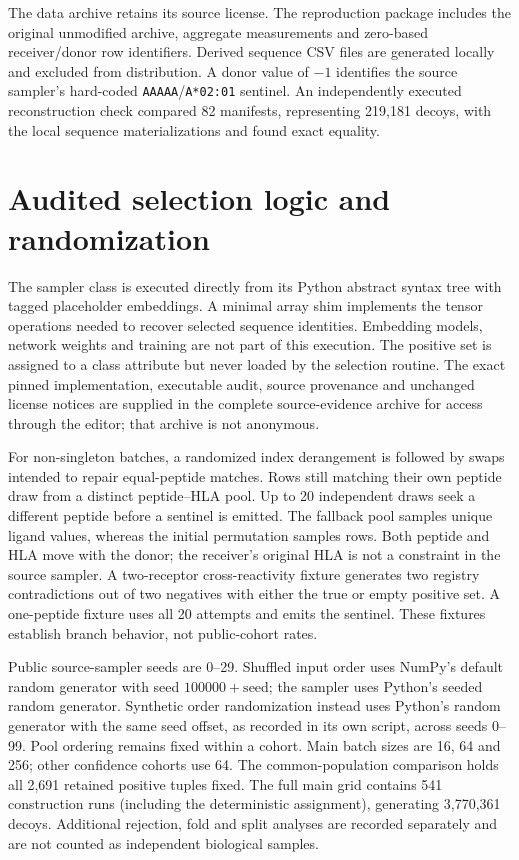 \documentclass[11pt,a4paper]{article}
\begin{document}
The data archive retains its source license. The reproduction package includes the original unmodified archive, aggregate measurements and zero-based receiver/donor row identifiers. Derived sequence CSV files are generated locally and excluded from distribution. A donor value of $-1$ identifies the source sampler's hard-coded \texttt{AAAAA}/\texttt{A*02:01} sentinel. An independently executed reconstruction check compared 82 manifests, representing 219,181 decoys, with the local sequence materializations and found exact equality.

\section{Audited selection logic and randomization}
The sampler class is executed directly from its Python abstract syntax tree with tagged placeholder embeddings. A minimal array shim implements the tensor operations needed to recover selected sequence identities. Embedding models, network weights and training are not part of this execution. The positive set is assigned to a class attribute but never loaded by the selection routine. The exact pinned implementation, executable audit, source provenance and unchanged license notices are supplied in the complete source-evidence archive for access through the editor; that archive is not anonymous.

For non-singleton batches, a randomized index derangement is followed by swaps intended to repair equal-peptide matches. Rows still matching their own peptide draw from a distinct peptide--HLA pool. Up to 20 independent draws seek a different peptide before a sentinel is emitted. The fallback pool samples unique ligand values, whereas the initial permutation samples rows. Both peptide and HLA move with the donor; the receiver's original HLA is not a constraint in the source sampler. A two-receptor cross-reactivity fixture generates two registry contradictions out of two negatives with either the true or empty positive set. A one-peptide fixture uses all 20 attempts and emits the sentinel. These fixtures establish branch behavior, not public-cohort rates.

Public source-sampler seeds are 0--29. Shuffled input order uses NumPy's default random generator with seed $100000+\mathrm{seed}$; the sampler uses Python's seeded random generator. Synthetic order randomization instead uses Python's random generator with the same seed offset, as recorded in its own script, across seeds 0--99. Pool ordering remains fixed within a cohort. Main batch sizes are 16, 64 and 256; other confidence cohorts use 64. The common-population comparison holds all 2,691 retained positive tuples fixed. The full main grid contains 541 construction runs (including the deterministic assignment), generating 3,770,361 decoys. Additional rejection, fold and split analyses are recorded separately and are not counted as independent biological samples.
\end{document}
